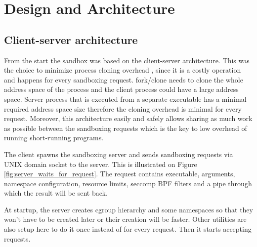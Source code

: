 \documentclass[en]{pracamgr}
\begin{document}
\chapter{Design and Architecture}\label{chapter:design}

\section{Client-server architecture}

From the start the sandbox was based on the client-server architecture. This was the choice to minimize process cloning overhead \cite{redis-latency-generated-by-fork}, since it is a costly operation and happens for every sandboxing request. fork/clone needs to clone the whole address space of the process and the client process could have a large address space. Server process that is executed from a separate executable has a minimal required address space size therefore the cloning overhead is minimal for every request. Moreover, this architecture easily and safely allows sharing as much work as possible between the sandboxing requests which is the key to low overhead of running short-running programs.

The client spawns the sandboxing server and sends sandboxing requests via UNIX domain socket to the server. This is illustrated on Figure \ref{fig:server_waits_for_request}. The request contains executable, arguments, namespace configuration, resource limits, seccomp BPF filters and a pipe through which the result will be sent back.

At startup, the server creates cgroup hierarchy and some namespaces so that they won't have to be created later or their creation will be faster. Other utilities are also setup here to do it once instead of for every request. Then it starts accepting requests.
\end{document}
